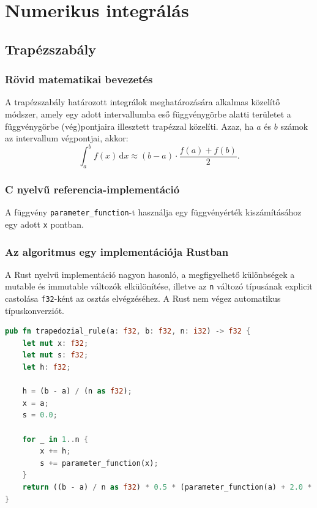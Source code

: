 
\section{Numerikus integrálás}

\subsection{Trapézszabály}

\subsubsection{Rövid matematikai bevezetés}

A trapézszabály határozott integrálok meghatározására alkalmas közelítő módszer, amely egy adott intervallumba eső függvénygörbe alatti területet a függvénygörbe (vég)pontjaira illesztett trapézzal közelíti. Azaz, ha $a$ és $b$ számok az intervallum végpontjai, akkor:
\[
\int_{a}^{b} \! f(x) \, \textrm{d} x \approx (b - a) \cdot \frac{f(a) + f(b)}{2}.
\]

\subsubsection{C nyelvű referencia-implementáció}
A függvény \lstinline{parameter_function}-t használja egy függvényérték kiszámításához egy adott \lstinline{x} pontban.

\subsubsection{Az algoritmus egy implementációja Rustban}
A Rust nyelvű implementáció nagyon hasonló, a megfigyelhető különbségek a mutable és immutable változók elkülönítése, illetve az \lstinline{n} változó típusának explicit castolása \lstinline{f32}-ként az osztás elvégzéséhez. A Rust nem végez automatikus típuskonverziót.
\begin{lstlisting}[language=Rust, style=boxed]
pub fn trapedozial_rule(a: f32, b: f32, n: i32) -> f32 {
    let mut x: f32;
    let mut s: f32;
    let h: f32;

    h = (b - a) / (n as f32);
    x = a;
    s = 0.0;

    for _ in 1..n {
        x += h;
        s += parameter_function(x);
    }
    return ((b - a) / n as f32) * 0.5 * (parameter_function(a) + 2.0 * s + parameter_function(b));
}
\end{lstlisting}

